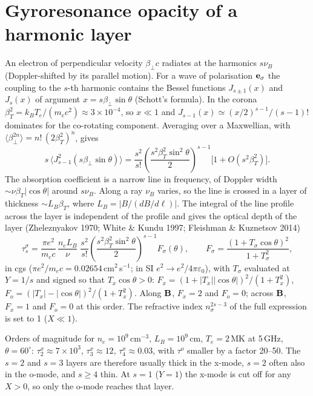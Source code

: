 \section{Gyroresonance opacity of a harmonic layer}
An electron of perpendicular velocity $\beta_\perp c$ radiates at the harmonics
$s\nu_B$ (Doppler-shifted by its parallel motion). For a wave of polarisation
$\mathbf{e}_\sigma$ the coupling to the $s$-th harmonic contains the Bessel functions
$J_{s\pm1}(x)$ and $J_s(x)$ of argument $x=s\beta_\perp\sin\theta$ (Schott's formula). In
the corona $\beta_T^2=k_BT_e/(m_ec^2)\approx3\times10^{-4}$, so $x\ll1$ and
$J_{s-1}(x)\simeq(x/2)^{s-1}/(s-1)!$ dominates for the co-rotating component. Averaging
over a Maxwellian, with $\langle\beta_\perp^{2n}\rangle=n!\,(2\beta_T^2)^n$, gives
\begin{equation}
  s\,\big\langle J_{s-1}^2(s\beta_\perp\sin\theta)\big\rangle
   = \frac{s^2}{s!}\left(\frac{s^2\beta_T^2\sin^2\theta}{2}\right)^{s-1}\big[1+O(s^2\beta_T^2)\big].
\end{equation}
The absorption coefficient is a narrow line in frequency, of Doppler width
$\sim\nu\beta_T|\cos\theta|$ around $s\nu_B$. Along a ray $\nu_B$ varies, so the line
is crossed in a layer of thickness $\sim L_B\beta_T$, where $L_B=|B/(dB/d\ell)|$. The
integral of the line profile across the layer is independent of the profile and gives
the optical depth of the layer (Zheleznyakov 1970; White \& Kundu 1997; Fleishman \&
Kuznetsov 2014)
\begin{equation}
  \tau_s^\sigma=\frac{\pi e^2}{m_ec}\,\frac{n_eL_B}{\nu}\;\frac{s^2}{s!}
   \left(\frac{s^2\beta_T^2\sin^2\theta}{2}\right)^{s-1}F_\sigma(\theta),\qquad
  F_\sigma=\frac{(1+T_\sigma\cos\theta)^2}{1+T_\sigma^2},
  \label{eq:grtau}
\end{equation}
in cgs ($\pi e^2/m_ec=0.02654$\,cm$^2$\,s$^{-1}$; in SI $e^2\to e^2/4\pi\varepsilon_0$),
with $T_\sigma$ evaluated at $Y=1/s$ and signed so that $T_x\cos\theta>0$:
$F_x=(1+|T_x||\cos\theta|)^2/(1+T_x^2)$, $F_o=(|T_x|-|\cos\theta|)^2/(1+T_x^2)$.
Along $\mathbf{B}$, $F_x=2$ and $F_o=0$; across $\mathbf{B}$, $F_x=1$ and $F_o=0$ at this order.
The refractive index $n_\sigma^{2s-3}$ of the full expression is set to 1 ($X\ll1$).

Orders of magnitude for $n_e=10^9$\,cm$^{-3}$, $L_B=10^9$\,cm, $T_e=2$\,MK at 5\,GHz,
$\theta=60^\circ$: $\tau_2^x\approx7\times10^{3}$, $\tau_3^x\approx12$,
$\tau_4^x\approx0.03$, with $\tau^o$ smaller by a factor 20--50. The $s=2$ and $s=3$
layers are therefore usually thick in the x-mode, $s=2$ often also in the o-mode, and
$s\ge4$ thin. At $s=1$ ($Y=1$) the x-mode is cut off for any $X>0$, so only the o-mode
reaches that layer.

